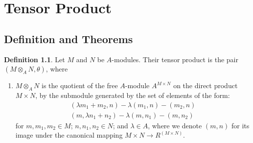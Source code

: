 \documentclass[a4paper]{book}
\theoremstyle{definition}
\newtheorem{definition}{Definition}[]
\begin{document}
\chapter{Tensor Product}
\section{Definition and Theorems}

\begin{defbox}
    \begin{definition}
        Let \(M\) and \(N\) be \(A\)-modules. Their tensor product is the pair \((M \otimes_A N, \theta)\), where
        \begin{enumerate}
            \item \(M \otimes_A N\) is the quotient of the free \(A\)-module \(A^{M \times N}\) on the direct product \(M \times N\), by the submodule generated by the set of elements of the form:
            \begin{align*}
                (\lambda m_1 + m_2, n) - \lambda (m_1, n) - (m_2, n) \\
                (m, \lambda n_1 + n_2) - \lambda (m, n_1) - (m, n_2)
            \end{align*}
            for \(m, m_1, m_2 \in M\); \(n, n_1, n_2 \in N\); and \(\lambda \in A\), where we denote \((m, n)\) for its image under the canonical mapping \(M \times N \rightarrow R^{(M \times N)}\).
        \end{enumerate}
    \end{definition}
\end{defbox}
\end{document}
